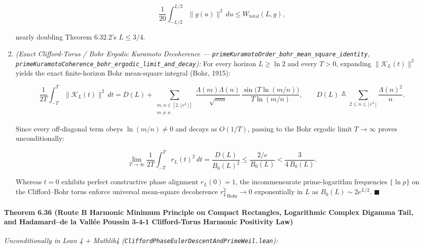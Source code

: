 \documentclass[
  11pt,
]{article}
\begin{document}
\begin{enumerate}
  \[\frac{1}{20}\int_{-L/2}^{L/2} \|g(u)\|^2\,du \le W_{\text{total}}(L, g),\]

  nearly doubling Theorem 6.32.2's \(L \le 3/4\).
\item
  \emph{(Exact Clifford-Torus / Bohr Ergodic Kuramoto Decoherence ---
  \texttt{primeKuramotoOrder\_bohr\_mean\_square\_identity},
  \texttt{primeKuramotoCoherence\_bohr\_ergodic\_limit\_and\_decay}):}
  For every horizon \(L \ge \ln 2\) and every \(T > 0\), expanding
  \(\|\mathcal{K}_L(t)\|^2\) yields the exact finite-horizon Bohr
  mean-square integral (Bohr, 1915):

  \[\frac{1}{2T}\int_{-T}^{T} \|\mathcal{K}_L(t)\|^2\,dt = D(L) + \sum_{\substack{m, n \in [2, \lfloor e^L \rfloor] \\ m \neq n}} \frac{\Lambda(m)\Lambda(n)}{\sqrt{mn}}\,\frac{\sin\!\big(T\ln(m/n)\big)}{T\ln(m/n)}, \qquad D(L) \triangleq \sum_{2 \le n \le \lfloor e^L \rfloor} \frac{\Lambda(n)^2}{n}.\]

  Since every off-diagonal term obeys \(\ln(m/n) \neq 0\) and decays as
  \(O(1/T)\), passing to the Bohr ergodic limit \(T \to \infty\) proves
  unconditionally:

  \[\lim_{T \to \infty} \frac{1}{2T}\int_{-T}^{T} r_L(t)^2\,dt = \frac{D(L)}{B_0(L)^2} \le \frac{2 / e}{B_0(L)} < \frac{3}{4\,B_0(L)}.\]

  Whereas \(t = 0\) exhibits perfect constructive phase alignment
  \(r_L(0) = 1\), the incommensurate prime-logarithm frequencies
  \(\{\ln p\}\) on the Clifford--Bohr torus enforce universal
  mean-square decoherence \(\overline{r_L^2}_{\text{Bohr}} \to 0\)
  exponentially in \(L\) as \(B_0(L) \sim 2e^{L/2}\). \(\blacksquare\)
\end{enumerate}

\paragraph{Theorem 6.36 (Route B Harmonic Minimum Principle on Compact
Rectangles, Logarithmic Complex Digamma Tail, and Hadamard--de la Vallée
Poussin 3-4-1 Clifford-Torus Harmonic Positivity
Law)}\label{theorem-6.36-route-b-harmonic-minimum-principle-on-compact-rectangles-logarithmic-complex-digamma-tail-and-hadamardde-la-valluxe9e-poussin-3-4-1-clifford-torus-harmonic-positivity-law}

\emph{Unconditionally in Lean 4 + Mathlib4
(\texttt{CliffordPhaseEulerDescentAndPrimeWeil.lean}):}
\end{document}
